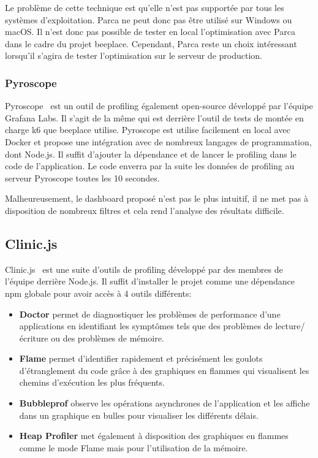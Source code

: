 Le problème de cette technique est qu'elle n'est pas supportée par tous les systèmes d'exploitation. Parca ne peut donc pas être utilisé sur Windows ou macOS. Il n'est donc pas possible de tester en local l'optimisation avec Parca dans le cadre du projet \gls{beeplace}. Cependant, Parca reste un choix intéressant lorsqu'il s'agira de tester l'optimisation sur le serveur de production.

\subsubsection{Pyroscope}

Pyroscope~\cite{pyroscope} est un outil de profiling également open-source développé par l'équipe Grafana Labs. Il s'agit de la même qui est derrière l'outil de tests de montée en charge k6 que \gls{beeplace} utilise. Pyroscope est utilise facilement en local avec Docker et propose une intégration avec de nombreux langages de programmation, dont Node.js. Il suffit d'ajouter la dépendance et de lancer le profiling dans le code de l'application. Le code enverra par la suite les données de profiling au serveur Pyroscope toutes les 10 secondes.

Malheureusement, le dashboard proposé n'est pas le plus intuitif, il ne met pas à disposition de nombreux filtres et cela rend l'analyse des résultats difficile.

\subsection{Clinic.js}

Clinic.js~\cite{clinicjs} est une suite d'outils de profiling développé par des membres de l'équipe derrière Node.js. Il suffit d'installer le projet comme une dépendance \gls{npm} globale pour avoir accès à 4 outils différents:

\begin{itemize}
  \item \textbf{Doctor} permet de diagnostiquer les problèmes de performance d'une applications en identifiant les symptômes tels que des problèmes de lecture/écriture ou des problèmes de mémoire.
  \item \textbf{Flame} permet d'identifier rapidement et précisément les goulots d'étranglement du code grâce à des graphiques en flammes qui visualisent les chemins d'exécution les plus fréquents.
  \item \textbf{Bubbleprof} observe les opérations asynchrones de l'application et les affiche dans un graphique en bulles pour visualiser les différents délais.
  \item \textbf{Heap Profiler} met également à disposition des graphiques en flammes comme le mode Flame mais pour l'utilisation de la mémoire.
\end{itemize}

